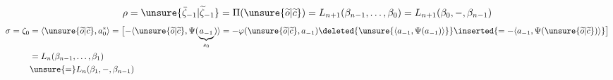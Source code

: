 \[
\rho=\unsure{\bar\zeta_{-1}|\widetilde\zeta_{-1}}
=\Pi(\unsure{\widetilde o|\widetilde c})
=L_{n+1}(\beta_{n-1},\ldots,\beta_0)
=L_{n+1}(\beta_0,\mathbin{-},\beta_{n-1})
\]
\[
\begin{aligned}
\sigma=\zeta_0
&=\langle\unsure{\widetilde o|\widetilde c},a_0^*\rangle
=\bigl[-\langle\unsure{\widetilde o|\widetilde c},\Psi(\underbrace{a_{-1}}_{s_0})\rangle
=-\varphi(\unsure{\widetilde o|\widetilde c},a_{-1})
\deleted{\unsure{\langle a_{-1},\Psi(a_{-1})\rangle}}
\inserted{=-\langle a_{-1},\Psi(\unsure{\widetilde o|\widetilde c})\rangle}\bigr]\\
&=L_n(\beta_{n-1},\ldots,\beta_1)\\
&\unsure{=}L_n(\beta_1,\mathbin{-},\beta_{n-1})
\end{aligned}
\]


